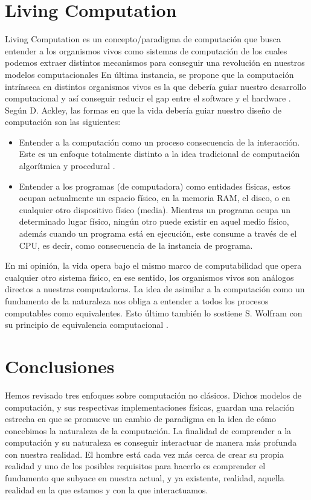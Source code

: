 \documentclass[conference]{IEEEtran}
\begin{document}
\section{Living Computation}
Living Computation es un concepto/paradigma de computación que busca entender a los organismos vivos como sistemas de computación de los cuales podemos extraer distintos mecanismos para conseguir una revolución en nuestros modelos computacionales \cite{aguilar2014thepast} En última instancia, se propone que la computación intrínseca en distintos organismos vivos es la que debería guiar nuestro desarrollo computacional y así conseguir reducir el gap entre el software y el hardware \cite{aguilar2014thepast}. Según D. Ackley, las formas en que la vida debería guiar nuestro diseño de computación son las siguientes:

\begin{itemize}
\item Entender a la computación como un proceso consecuencia de la interacción. Este es un enfoque totalmente distinto a la idea tradicional de computación algorítmica y procedural \cite{lynn1998what} \cite{wegner1997interaction}.
\item Entender a los programas (de computadora) como entidades físicas, estos ocupan actualmente un espacio físico, en la memoria RAM, el disco, o en cualquier otro dispositivo físico (media). Mientras un programa ocupa un determinado lugar físico, ningún otro puede existir en aquel medio físico, además cuando un programa está en ejecución, este consume a través de el CPU, es decir, como consecuencia de la instancia de programa.
\end{itemize}

En mi opinión, la vida opera bajo el mismo marco de computabilidad que opera cualquier otro sistema físico, en ese sentido, los organismos vivos son análogos directos a nuestras computadoras. La idea de asimilar a la computación como un fundamento de la naturaleza nos obliga a entender a todos los procesos computables como equivalentes. Esto último también lo sostiene S. Wolfram con su principio de equivalencia computacional \cite{wolfram2002new} \cite{flake1998computational}.

\section{Conclusiones}
Hemos revisado tres enfoques sobre computación no clásicos. Dichos modelos de computación, y sus respectivas implementaciones físicas, guardan una relación estrecha en que se promueve un cambio de paradigma en la idea de cómo concebimos la naturaleza de la computación. La finalidad de comprender a la computación y su naturaleza es conseguir interactuar de manera más profunda con nuestra realidad. El hombre está cada vez más cerca de crear su propia realidad y uno de los posibles requisitos para hacerlo es comprender el fundamento que subyace en nuestra actual, y ya existente, realidad, aquella realidad en la que estamos y con la que interactuamos.
\end{document}
